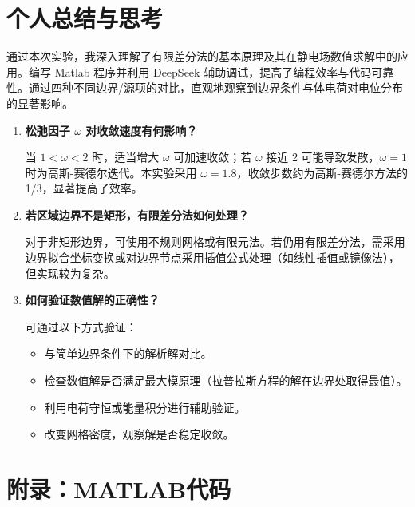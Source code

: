 \documentclass{../ElectromagneticFieldTemplate}
\begin{document}
\section{个人总结与思考}

通过本次实验，我深入理解了有限差分法的基本原理及其在静电场数值求解中的应用。编写 Matlab 程序并利用 DeepSeek 辅助调试，提高了编程效率与代码可靠性。通过四种不同边界/源项的对比，直观地观察到边界条件与体电荷对电位分布的显著影响。

\begin{enumerate}
    \item \textbf{松弛因子 \(\omega\) 对收敛速度有何影响？}
    \par 当 \(1<\omega<2\) 时，适当增大 \(\omega\) 可加速收敛；若 \(\omega\) 接近 2 可能导致发散，\(\omega=1\) 时为高斯-赛德尔迭代。本实验采用 \(\omega=1.8\)，收敛步数约为高斯-赛德尔方法的 1/3，显著提高了效率。

    \item \textbf{若区域边界不是矩形，有限差分法如何处理？}
    \par 对于非矩形边界，可使用不规则网格或有限元法。若仍用有限差分法，需采用边界拟合坐标变换或对边界节点采用插值公式处理（如线性插值或镜像法），但实现较为复杂。

    \item \textbf{如何验证数值解的正确性？}
    \par 可通过以下方式验证：
    \begin{itemize}
        \item 与简单边界条件下的解析解对比。
        \item 检查数值解是否满足最大模原理（拉普拉斯方程的解在边界处取得最值）。
        \item 利用电荷守恒或能量积分进行辅助验证。
        \item 改变网格密度，观察解是否稳定收敛。
    \end{itemize}
\end{enumerate}

\section*{附录：MATLAB代码}
\end{document}
